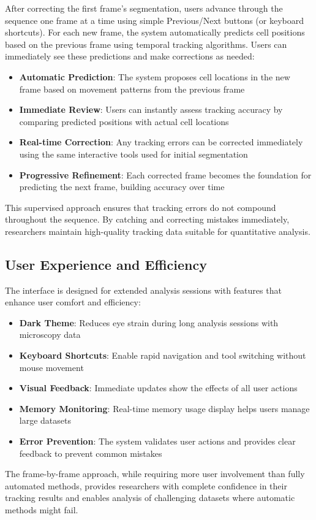 \documentclass[../cellseek_paper.tex]{subfiles}
\begin{document}
After correcting the first frame's segmentation, users advance through the sequence one frame at a time using simple Previous/Next buttons (or keyboard shortcuts). For each new frame, the system automatically predicts cell positions based on the previous frame using temporal tracking algorithms. Users can immediately see these predictions and make corrections as needed:

\begin{itemize}
  \item \textbf{Automatic Prediction}: The system proposes cell locations in the new frame based on movement patterns from the previous frame
  \item \textbf{Immediate Review}: Users can instantly assess tracking accuracy by comparing predicted positions with actual cell locations
  \item \textbf{Real-time Correction}: Any tracking errors can be corrected immediately using the same interactive tools used for initial segmentation
  \item \textbf{Progressive Refinement}: Each corrected frame becomes the foundation for predicting the next frame, building accuracy over time
\end{itemize}

This supervised approach ensures that tracking errors do not compound throughout the sequence. By catching and correcting mistakes immediately, researchers maintain high-quality tracking data suitable for quantitative analysis.

\subsection{User Experience and Efficiency}

The interface is designed for extended analysis sessions with features that enhance user comfort and efficiency:

\begin{itemize}
  \item \textbf{Dark Theme}: Reduces eye strain during long analysis sessions with microscopy data
  \item \textbf{Keyboard Shortcuts}: Enable rapid navigation and tool switching without mouse movement
  \item \textbf{Visual Feedback}: Immediate updates show the effects of all user actions
  \item \textbf{Memory Monitoring}: Real-time memory usage display helps users manage large datasets
  \item \textbf{Error Prevention}: The system validates user actions and provides clear feedback to prevent common mistakes
\end{itemize}

The frame-by-frame approach, while requiring more user involvement than fully automated methods, provides researchers with complete confidence in their tracking results and enables analysis of challenging datasets where automatic methods might fail.
\end{document}
